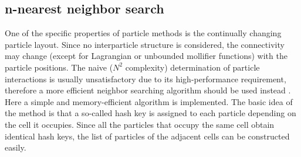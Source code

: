 \documentclass[a4paper,12pt,openany]{book}
\theoremstyle{break}
\begin{document}
\subsection{n-nearest neighbor search} \label{sec:neighbor_search}
One of the specific properties of particle methods is the continually changing particle layout. Since no interparticle structure is considered, the connectivity may change (except for Lagrangian or unbounded mollifier functions) with the particle positions. The naive ($N^2$ complexity) determination of particle interactions is usually unsatisfactory due to its high-performance requirement, therefore a more efficient neighbor searching algorithm should be used instead \cite{CUDA_EXAMPLE}. Here a simple and memory-efficient algorithm is implemented. The basic idea of the method is that a so-called hash key is assigned to each particle depending on the cell it occupies. Since all the particles that occupy the same cell obtain identical hash keys, the list of particles of the adjacent cells can be constructed easily.
\end{document}

